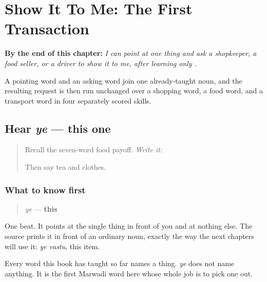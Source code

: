 
\chapter{Show It To Me: The First Transaction}
\label{ch:mw-show-request}

\begin{chapteropening}
\textbf{By the end of this chapter:} \emph{I can point at one thing and ask a shopkeeper, a food seller, or a driver to show it to me, after learning only .}

A pointing word and an asking word join one already-taught noun, and the resulting request is then run unchanged over a shopping word, a food word, and a transport word in four separately scored skills.
\end{chapteropening}

\section[ye]{Hear \emph{ye} — this one}

\label{lesson:MW-C21-hear-ye}



\begin{quote}
Recall the seven-word food payoff. \emph{Write it:} \textbf{}

Then say tea and clothes.
\end{quote}

\subsection*{What to know first}
\begin{quote}
\emph{ye} — \textbf{this}
\end{quote}

One beat. It points at the single thing in front of you and at nothing else. The source prints it in front of an ordinary noun, exactly the way the next chapters will use it: \emph{ye vastu}, this item.

Every word this book has taught so far names a thing. \emph{ye} does not name anything. It is the first Marwadi word here whose whole job is to pick one out.

